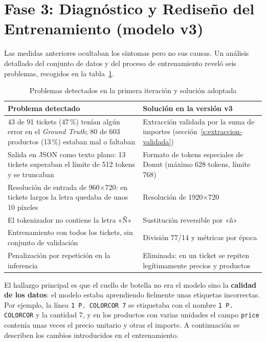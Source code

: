 \section{Fase 3: Diagnóstico y Rediseño del Entrenamiento (modelo v3)}
\label{s:diagnostico}
Las medidas anteriores ocultaban los síntomas pero no sus causas. Un análisis detallado del conjunto de datos y del proceso de entrenamiento reveló seis problemas, recogidos en la tabla~\ref{tab:diagnostico}.

\begin{table}[htbp]
    \caption{\label{tab:diagnostico}Problemas detectados en la primera iteración y solución adoptada}
    \begin{tabularx}{\textwidth}{@{}XX@{}}
        \toprule
        \textbf{Problema detectado} & \textbf{Solución en la versión v3} \\
        \midrule
        43 de 91 tickets (47\,\%) tenían algún error en el \textit{Ground Truth}; 80 de 603 productos (13\,\%) estaban mal o faltaban & Extracción validada por la suma de importes (sección~\ref{s:extraccion-validada}) \\
        Salida en JSON como texto plano: 13 tickets superaban el límite de 512 tokens y se truncaban & Formato de tokens especiales de Donut (máximo 628 tokens, límite 768) \\
        Resolución de entrada de 960$\times$720: en tickets largos la letra quedaba de unos 10 píxeles & Resolución de 1920$\times$720 \\
        El tokenizador no contiene la letra «Ñ» & Sustitución reversible por «ñ» \\
        Entrenamiento con todos los tickets, sin conjunto de validación & División 77/14 y métricas por época \\
        Penalización por repetición en la inferencia & Eliminada: en un ticket se repiten legítimamente precios y productos \\
        \bottomrule
    \end{tabularx}
\end{table}

El hallazgo principal es que el cuello de botella no era el modelo sino la \textbf{calidad de los datos}: el modelo estaba aprendiendo fielmente unas etiquetas incorrectas. Por ejemplo, la línea \texttt{1 P. COLORCOR 7} se etiquetaba con el nombre \texttt{1 P. COLORCOR} y la cantidad 7, y en los productos con varias unidades el campo \texttt{price} contenía unas veces el precio unitario y otras el importe. A continuación se describen los cambios introducidos en el entrenamiento.

